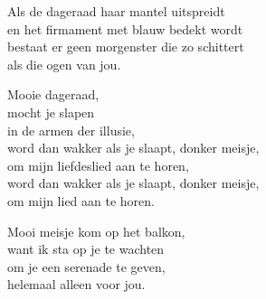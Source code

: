 \clearpage

\begin{translation}
Als de dageraad haar mantel uitspreidt\\
en het firmament met blauw bedekt wordt\\
bestaat er geen morgenster die zo schittert\\
als die ogen van jou.\vspace{\wlskip}

Mooie dageraad,\\
mocht je slapen\\
in de armen der illusie,\\
word dan wakker als je slaapt, donker meisje,\\
om mijn liefdeslied aan te horen,\\
word dan wakker als je slaapt, donker meisje,\\
om mijn lied aan te horen.\vspace{\wlskip}

Mooi meisje kom op het balkon,\\
want ik sta op je te wachten\\
om je een serenade te geven,\\
helemaal alleen voor jou.\\
\end{translation}
